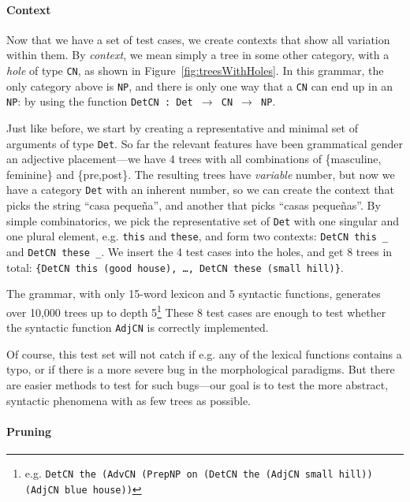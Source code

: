 \documentclass[11pt]{article}
\def\t#1{\texttt{#1}}
\begin{document}
\paragraph{Context} 

Now that we have a set of test cases, we create contexts that show all
variation within them. By \emph{context}, we mean simply a tree in
some other category, with a \emph{hole} of type \t{CN}, as shown in
Figure~\ref{fig:treesWithHoles}. 
In this grammar, the only category above is \t{NP}, and there is only
one way that a \t{CN} can end up in an \t{NP}: by using the function
\t{DetCN : Det $\rightarrow$ CN $\rightarrow$ NP}. 

Just like before, we start by creating a representative and minimal
set of arguments of type \t{Det}. So far the relevant features have
been grammatical gender an adjective placement---we have 4 trees with
all combinations of \{masculine, feminine\} and \{pre,post\}. The
resulting trees have \emph{variable} number, but now we have a
category \t{Det} with an inherent number, so we can create the context
that picks the string ``casa  peque\~{n}a'', and another that picks
``casas  peque\~{n}as''. By simple combinatorics, we pick the
representative set of \t{Det} with one singular and one plural
element, e.g. \t{this} and \t{these}, and form two contexts:
\verb|DetCN this _| and  \verb|DetCN these _|. We insert the 4 test
cases into the holes, and get 8 trees in total: \t{\{DetCN this (good
  house), \dots, DetCN these (small hill)\}}. 


The grammar, with only 15-word lexicon and 5 syntactic functions,
generates over 10,000 %
trees up to depth 5\footnote{e.g. {\tt DetCN the (AdvCN (PrepNP on (DetCN
    the (AdjCN small hill)) (AdjCN blue house))}}
These 8 test cases are enough to test whether the
syntactic function \t{AdjCN} is correctly implemented.   

Of course, this test set will not catch if e.g. any of the lexical
functions contains a typo, or if there is a more severe bug in the
morphological paradigms. But there are easier methods to test for such
bugs---our goal is to test the more abstract, syntactic phenomena with
as few trees as possible. 


\paragraph{Pruning}
\end{document}

